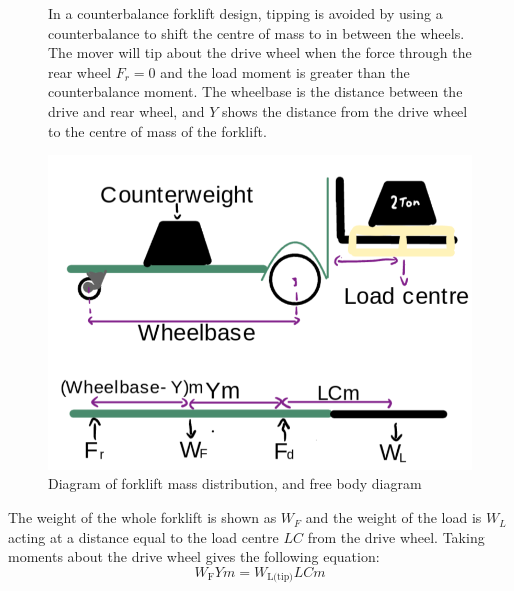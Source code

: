 \documentclass[12pt]{article}
\begin{document}
\begin{figure}[H]
    \centering
    \begin{minipage}[t]{0.57\textwidth}
        \vspace{0pt} %
        In a counterbalance forklift design, tipping is avoided by using a counterbalance to shift the centre of mass to in between the wheels. The mover will tip about the drive wheel when the force through the rear wheel \( F_r = 0 \) and the load moment is greater than the counterbalance moment. The wheelbase is the distance between the drive and rear wheel, and \( Y \) shows the distance from the drive wheel to the centre of mass of the forklift. 
    \end{minipage}%
    \hfill
    \begin{minipage}[t]{0.38\textwidth}
        \vspace{-30pt} 
        \centering
        \includegraphics[width=\linewidth]{Tipping Calculations 3.png}
        \vspace{-30pt}
        \caption{Diagram of forklift mass distribution, and free body diagram}
        \label{fig:x}
    \end{minipage}
\end{figure}
The weight of the whole forklift is shown as \(W_F\) and the weight of the load is \(W_L\) acting at a distance equal to the load centre \(LC\) from the drive wheel. Taking moments about the drive wheel gives the following equation:
\vspace{-10pt}
\begin{equation}
    W_{\text{F}}Ym = W_{\text{L(tip)}}LCm
\end{equation}
\vspace{-35pt}
\end{document}
